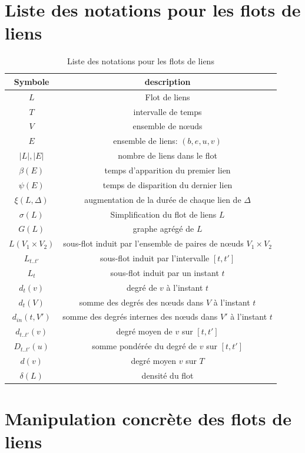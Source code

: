\section{Liste des notations pour les flots de liens}
\begin{table}[h]
	\centering
	\begin{tabular}{|c|c|}
	\hline Symbole & description \\
	\hline $L$ & Flot de liens \\ 
	$T$ & intervalle de temps  \\
	$V$ & ensemble de n\oe{}uds\\
	$E$ & ensemble de liens: $(b,e,u,v)$ \\
	$|L|,|E|$ & nombre de liens dans le flot \\
	$\beta(E)$ & temps d'apparition du premier lien\\
	$\psi(E)$ & temps de disparition du dernier lien\\
	$\xi(L,\Delta)$ & augmentation de la durée de chaque lien de $\Delta$\\
	$\sigma(L)$ & Simplification du flot de liens $L$\\
	$G(L)$ & graphe agrégé de $L$\\
	$L(V_1\times V_2)$ & sous-flot induit par l'ensemble de paires de n\oe{}uds $V_1\times V_2$ \\
	$L_{t..t'}$ & sous-flot induit par l'intervalle $[t,t']$ \\
	$L_{t}$ & sous-flot induit par un instant $t$\\
	$d_t(v)$ & degré de $v$ à l'instant $t$\\
	$d_t(V)$ & somme des degrés des n\oe{}uds dans $V$ à l'instant $t$\\
	$d_{in}(t,V')$ & somme des degrés internes des n\oe{}uds dans $V'$ à l'instant $t$\\
	$d_{t..t'}(v)$ & degré moyen de $v$ sur $[t,t']$\\
	$D_{t..t'}(u)$ & somme pondérée du degré de $v$ sur $[t,t']$\\
	$d(v)$ & degré moyen $v$ sur $T$\\
	$\delta(L)$ & densité du flot\\
	\hline
	\end{tabular} 
		\caption{Liste des notations pour les flots de liens}
\end{table}

\section{Manipulation concrète des flots de liens}

